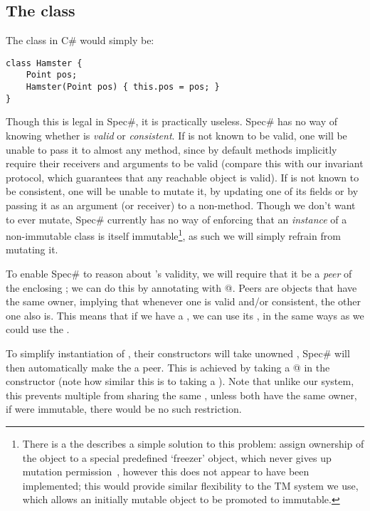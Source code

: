 \subsection{The \Q@Hamster@ class} 
The \Q@Hamster@ class in C\# would simply be:
\begin{lstlisting}
class Hamster {
	Point pos;
	Hamster(Point pos) { this.pos = pos; }
}
\end{lstlisting}
Though this is legal in Spec\#, it is practically useless. Spec\# has no way of knowing whether \Q@pos@ is \emph{valid} or \emph{consistent}. If \Q@pos@ is not known to be valid, one will be unable to pass it to almost any method, since by default methods implicitly require their receivers and arguments to be valid (compare this with our invariant protocol, which guarantees that any reachable object is valid).
If \Q@pos@ is not known to be consistent, one will be unable to mutate it, by updating one of its fields or by passing it as an argument (or receiver) to a non-\Q@Pure@ method.
Though we don't want \Q@pos@ to ever mutate, Spec\# currently has no way of enforcing that an \emph{instance} of a non-immutable class is itself immutable\footnote{There is a the describes a simple solution to this problem: assign ownership of the object to a special predefined `freezer' object, which never gives up mutation permission~\cite{DBLP:conf/vstte/LeinoMW08}, however this does not appear to have been implemented; this would provide similar flexibility to the TM system we use, which allows an initially mutable object to be promoted to immutable.}, as such we will simply refrain from mutating it.

To enable Spec\# to reason about \Q@pos@'s validity, we will require that it be a \emph{peer} of the enclosing \Q@Hamster@; we can do this by annotating \Q@pos@ with \Q@[Peer]@. Peers are objects that have the same owner, implying that  whenever one is valid and/or consistent, the other one also is. This means that if we have a \Q@Hamster@, we can use its \Q@pos@, in the same ways as we could use the \Q@Hamster@.

To simplify instantiation of \Q@Hamster@s, their constructors will take unowned \Q@Point@s, Spec\# will then automatically make the \Q@Point@ a peer. This is achieved by taking a \Q@[Captured]@ \Q@Point@ in the constructor (note how similar this is to taking a \Q@capsule@ \Q@Point@). Note that unlike our system, this prevents multiple \Q@Hamster@s from sharing the same \Q@Point@, unless both \Q@Hamster@s have the same owner, if \Q@Point@ were immutable, there would be no such restriction.

